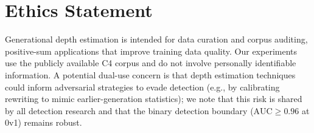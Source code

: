 \documentclass[11pt]{article}
\newcommand{\auc}{\text{AUC}}
\begin{document}
\section*{Ethics Statement}

Generational depth estimation is intended for data curation and corpus auditing, positive-sum applications that improve training data quality.
Our experiments use the publicly available C4 corpus and do not involve personally identifiable information.
A potential dual-use concern is that depth estimation techniques could inform adversarial strategies to evade detection (e.g., by calibrating rewriting to mimic earlier-generation statistics); we note that this risk is shared by all detection research and that the binary detection boundary ($\auc \geq 0.96$ at 0v1) remains robust.





\end{document}

